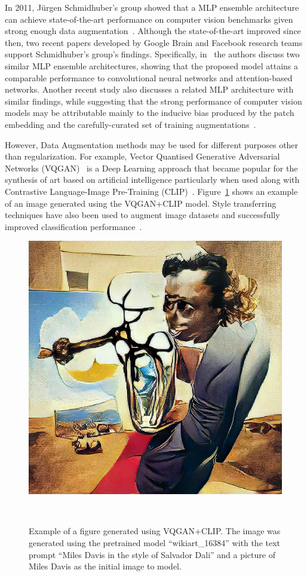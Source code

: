 \documentclass[parskip=full]{scrartcl}
\begin{document}
In 2011, Jürgen Schmidhuber's group showed that a MLP ensemble architecture
can achieve state-of-the-art performance on computer vision benchmarks given
strong enough data augmentation~\cite{Meier2011, Ciresan2011}. Although the
state-of-the-art improved since then, two recent papers developed by Google
Brain and Facebook research teams support Schmidhuber's group's findings.
Specifically, in~\cite{Tolstikhin2021, Touvron2021} the authors discuss two
similar MLP ensemble architectures, showing that the proposed model attains a
comparable performance to convolutional neural networks and attention-based
networks. Another recent study also discusses a related MLP architecture with
similar findings, while suggesting that the strong performance of computer
vision models may be attributable mainly to the inducive bias produced by the
patch embedding and the carefully-curated set of training
augmentations~\cite{Melaskyriazi2021}.


However, Data Augmentation methods may be used for different purposes other
than regularization. For example, Vector Quantised Generative Adversarial
Networks (VQGAN)~\cite{Esser2020} is a Deep Learning approach that became
popular for the synthesis of art based on artificial intelligence particularly
when used along with Contrastive Language-Image Pre-Training
(CLIP)~\cite{Radford2021}. Figure~\ref{fig:super_miles_dali} shows an example
of an image generated using the VQGAN+CLIP model. Style transferring
techniques have also been used to augment image datasets and successfully
improved classification performance~\cite{Wang2017}.

\begin{figure}[H]
	\centering
	\includegraphics[width=.4\linewidth]{../analysis/super_miles_dali}
    \caption{%
        Example of a figure generated using VQGAN+CLIP\@. The image was
        generated using the pretrained model ``wikiart\_16384'' with the text
        prompt ``Miles Davis in the style of Salvador Dali'' and a picture of
        Miles Davis as the initial image to model.
    }~\label{fig:super_miles_dali}
\end{figure}
\end{document}

